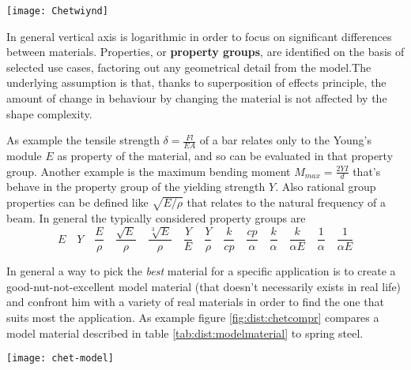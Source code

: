 	\begin{SCfigure}[2][bht]
		\centering \texttt{[image: Chetwiynd]}
		\caption{example of Chetwiynd histogram that compares aluminium alloys versus the steels one.} \label{fig:dist:Chetwiynd}	
	\end{SCfigure}
	
	In general vertical axis is logarithmic in order to focus on significant differences between materials. Properties, or \textbf{property groups}, are identified on the basis of selected use cases, factoring out any geometrical detail from the model.The underlying assumption is that, thanks to superposition of effects principle, the amount of change in behaviour by changing the material is not affected by the shape complexity.
	
	As example the tensile strength $\delta = \frac{Fl}{EA}$ of a bar relates only to the Young's module $E$ as property of the material,  and so can be evaluated in that property group. Another example is the maximum bending moment $M_{max}= \frac{2YI}{d}$ that's behave in the property group of the yielding strength $Y$. Also rational group properties can be defined like $\sqrt{E/\rho}$ that relates to the natural frequency of a beam. In general the typically considered property groups are
	\[ E \quad Y \quad \frac E \rho \quad \frac{\sqrt E}{\rho} \quad \frac{\sqrt[3] E}{\rho} \quad \frac Y E \quad \frac Y\rho \quad \frac k {cp} \quad \frac{cp}{\alpha} \quad \frac k\alpha \quad \frac k{\alpha E} \quad \frac 1 \alpha \quad \frac{1}{\alpha E} \]
	
	In general a way to pick the \textit{best} material for a specific application is to create a good-nut-not-excellent model material (that doesn't necessarily exists in real life) and confront him with a variety of real materials in order to find the one that suits most the application. As example figure \ref{fig:dist:chetcompr} compares a model material described in table \ref{tab:dist:modelmaterial} to spring steel.
	
	\begin{SCfigure}[2][bht]
		\centering \texttt{[image: chet-model]}
		\caption{example of Chetwynd histogram comparing spring steel and model material (table \ref{tab:dist:modelmaterial}).} \label{fig:dist:chetcompr}
	\end{SCfigure}
	
